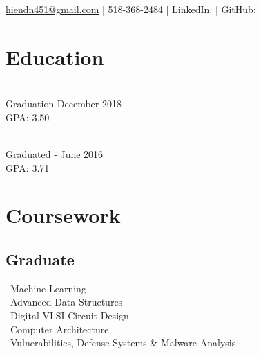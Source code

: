 \documentclass[]{deedy_format_Hien}
\begin{document}
%
%
\lastupdated

%
%


{\href{mailto:hiendn451@gmail.com}{hiendn451@gmail.com} | 518-368-2484 | 
LinkedIn:  \href{https://www.linkedin.com/in/hien-nguyen-5567149a}{} |
GitHub:   \href{https://github.com/nguyenduchien1994}{}
}

%
%

\begin{minipage}[t]{0.325\textwidth} 


\section{Education} 
\vspace{0.5mm} %
\\
Graduation December 2018 \\ GPA: 3.50
\sectionsep

\\		
Graduated - June 2016 \\ GPA: 3.71
\sectionsep

\sectionsep

\section{Coursework}
\vspace{0.5mm} %
\flushleft
\subsection{Graduate}
\textbullet \, Machine Learning \\
\textbullet \, Advanced Data Structures \\
\textbullet \, Digital VLSI Circuit Design \\
\textbullet \, Computer Architecture \\
\textbullet \, Vulnerabilities, Defense Systems \& Malware Analysis \\
\sectionsep


\end{minipage}
\end{document}
